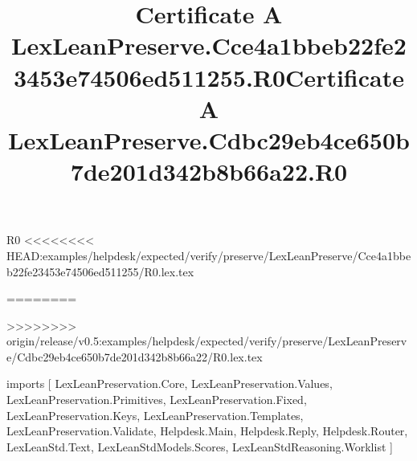 \begin{lexlean}{R0}
<<<<<<<< HEAD:examples/helpdesk/expected/verify/preserve/LexLeanPreserve/Cce4a1bbeb22fe23453e74506ed511255/R0.lex.tex
\title{Certificate A LexLeanPreserve.Cce4a1bbeb22fe23453e74506ed511255.R0}
========
\title{Certificate A LexLeanPreserve.Cdbc29eb4ce650b7de201d342b8b66a22.R0}
>>>>>>>> origin/release/v0.5:examples/helpdesk/expected/verify/preserve/LexLeanPreserve/Cdbc29eb4ce650b7de201d342b8b66a22/R0.lex.tex
\begin{coremodule}
imports [
  LexLeanPreservation.Core,
  LexLeanPreservation.Values,
  LexLeanPreservation.Primitives,
  LexLeanPreservation.Fixed,
  LexLeanPreservation.Keys,
  LexLeanPreservation.Templates,
  LexLeanPreservation.Validate,
  Helpdesk.Main,
  Helpdesk.Reply,
  Helpdesk.Router,
  LexLeanStd.Text,
  LexLeanStdModels.Scores,
  LexLeanStdReasoning.Worklist
]


\end{coremodule}
\end{lexlean}
